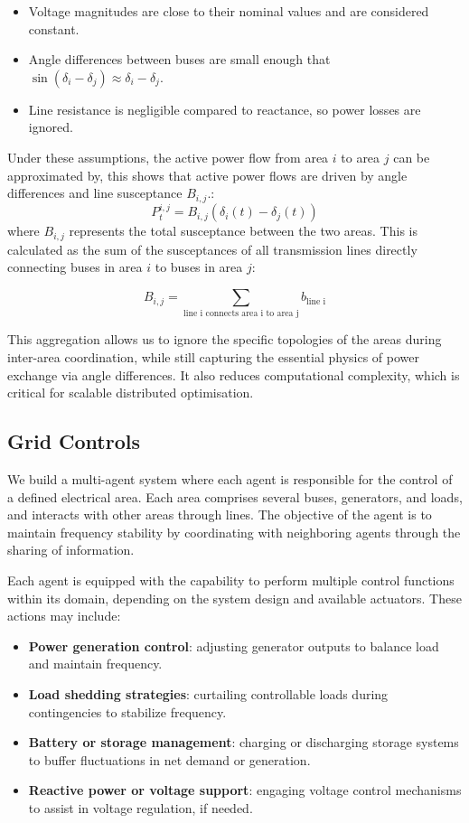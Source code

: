 \documentclass{article}
\begin{document}
\begin{itemize}
    \item Voltage magnitudes are close to their nominal values and are considered constant.
    \item Angle differences between buses are small enough that $\sin(\delta_i - \delta_j) \approx \delta_i - \delta_j$.
    \item Line resistance is negligible compared to reactance, so power losses are ignored.
\end{itemize}

Under these assumptions, the active power flow from area $i$ to area $j$ can be approximated by, this shows that active power flows are driven by angle differences and line susceptance $B_{i,j}$.:
\begin{equation}
    P^{i,j}_t = B_{i,j}(\delta_i(t) - \delta_j(t))
\end{equation}
where $B_{i,j}$ represents the total susceptance between the two areas. This is calculated as the sum of the susceptances of all transmission lines directly connecting buses in area $i$ to buses in area $j$:

\begin{equation}
    B_{i,j} = \sum_{\text{line i connects area i to area j}} b_{\text{line i}}
\end{equation}

This aggregation allows us to ignore the specific topologies of the areas during inter-area coordination, while still capturing the essential physics of power exchange via angle differences. It also reduces computational complexity, which is critical for scalable distributed optimisation.

\subsection*{Grid Controls}

We build a multi-agent system where each agent is responsible for the control of a defined electrical area. Each area comprises several buses, generators, and loads, and interacts with other areas through lines. The objective of the agent is to maintain frequency stability by coordinating with neighboring agents through the sharing of information. 

Each agent is equipped with the capability to perform multiple control functions within its domain, depending on the system design and available actuators. These actions may include:
\begin{itemize}
    \item \textbf{Power generation control}: adjusting generator outputs to balance load and maintain frequency.
    \item \textbf{Load shedding strategies}: curtailing controllable loads during contingencies to stabilize frequency.
    \item \textbf{Battery or storage management}: charging or discharging storage systems to buffer fluctuations in net demand or generation.
    \item \textbf{Reactive power or voltage support}: engaging voltage control mechanisms to assist in voltage regulation, if needed.
\end{itemize}
\end{document}

